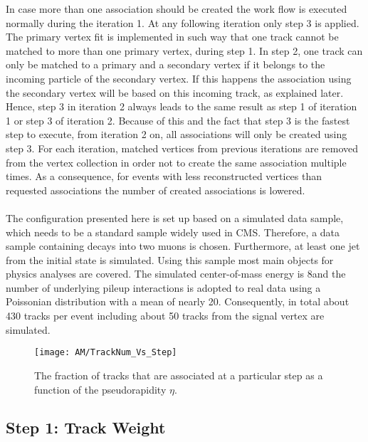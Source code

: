 In case more than one association should be created the work flow is executed normally during the iteration 1. At any following iteration only step 3 is applied. The primary vertex fit is implemented in such way that one track cannot be matched to more than one primary vertex, during step 1. In step 2, one track can only be matched to a primary and a secondary vertex if it belongs to the incoming particle of the secondary vertex. If this happens the association using the secondary vertex will be based on this incoming track, as explained later. Hence, step 3 in iteration 2 always leads to the same result as step 1 of iteration 1 or  step 3 of iteration 2. Because of this and the fact that step 3 is the fastest step to execute, from iteration 2 on, all associations will only be created using step 3. For each iteration, matched vertices from previous iterations are removed from the vertex collection in order not to create the same association multiple times. As a consequence, for events with less reconstructed vertices than requested associations the number of created associations is lowered. \\ \\
The configuration presented here is set up based on a simulated data sample, which needs to be a standard sample widely used in CMS. Therefore, a data sample containing \Zz decays into two muons is chosen. Furthermore, at least one jet from the initial state is simulated. Using this sample most main objects for physics analyses are covered. The simulated center-of-mass energy is 8\TeV and the number of underlying pileup interactions is adopted to real data using a Poissonian distribution with a mean of nearly 20. Consequently, in total about 430 tracks per event including about 50 tracks from the signal vertex are simulated.

\begin{figure}[!ht]
    \centering
    \texttt{[image: AM/TrackNum\_Vs\_Step]}
    \caption[Plot of the fraction of tracks to be associated at which step]{The fraction of tracks that are associated at a particular step as a function of the pseudorapidity $\eta{}$.\label{plot:AMTrackStepFrac}}
\end{figure}

\subsection{Step 1: Track Weight \label{sec:AMWFTW}}

